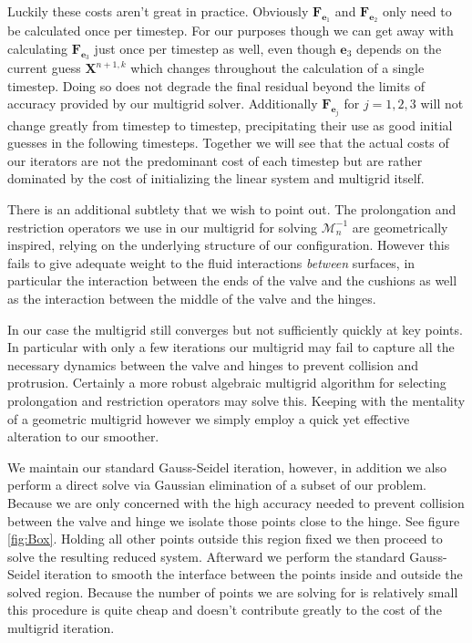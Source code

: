 \documentclass[preprint,12pt]{elsarticle}
\begin{document}
Luckily these costs aren't great in practice. Obviously $\mathbf{F}_{\mathbf{e}_1}$ and $\mathbf{F}_{\mathbf{e}_2}$ only need to be calculated once per timestep. For our purposes though we can get away with calculating $\mathbf{F}_{\mathbf{e}_3}$ just once per timestep as well, even though $\mathbf{e}_3$ depends on the current guess $\mathbf{X}^{n+1,k}$ which changes throughout the calculation of a single timestep. Doing so does not degrade the final residual beyond the limits of accuracy provided by our multigrid solver.
Additionally  $\mathbf{F}_{\mathbf{e}_j}$ for $j=1,2,3$ will not change greatly from timestep to timestep, precipitating their use as good initial guesses in the following timesteps. Together we will see that the actual costs of our iterators are not the predominant cost of each timestep but are rather dominated by the cost of initializing the linear system and multigrid itself.

There is an additional subtlety that we wish to point out. The prolongation and restriction operators we use in our multigrid for solving $\mathcal{M}_n^{-1}$ are geometrically inspired, relying on the underlying structure of our configuration. However this fails to give adequate weight to the fluid interactions \textit{between} surfaces, in particular the interaction between the ends of the valve and the cushions as well as the interaction between the middle of the valve and the hinges.

In our case the multigrid still converges but not sufficiently quickly at key points. In particular with only a few iterations our multigrid may fail to capture all the necessary dynamics between the valve and hinges to prevent collision and protrusion. Certainly a more robust algebraic multigrid algorithm for selecting prolongation and restriction operators may solve this. Keeping with the mentality of a geometric multigrid however we simply employ a quick yet effective alteration to our smoother.

We maintain our standard Gauss-Seidel iteration, however, in addition we also perform a direct solve via Gaussian elimination of a subset of our problem. Because we are only concerned with the high accuracy needed to prevent collision between the valve and hinge we isolate those points close to the hinge. See figure \ref{fig:Box}. Holding all other points outside this region fixed we then proceed to solve the resulting reduced system. Afterward we perform the standard Gauss-Seidel iteration to smooth the interface between the points inside and outside the solved region. Because the number of points we are solving for is relatively small this procedure is quite cheap and doesn't contribute greatly to the cost of the multigrid iteration.
 
\end{document}
